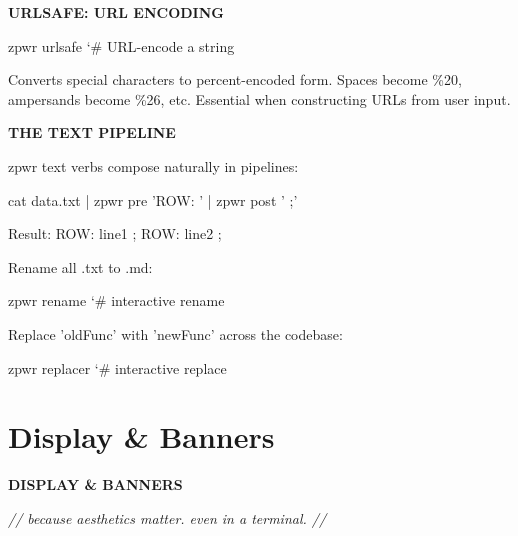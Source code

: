 \documentclass[11pt,a4paper,twoside]{book}
\begin{document}
\vspace{12pt}
{\bfseries\color{neonyellow} URLSAFE: URL ENCODING}\vspace{4pt}

\begin{codebox}
\color{neongreen}zpwr urlsafe                        {\char`\#} URL-encode a string\\
\end{codebox}

Converts special characters to percent-encoded form. Spaces become \%20, ampersands become \%26, etc. Essential when constructing URLs from user input.


\vspace{12pt}
{\bfseries\color{neonyellow} THE TEXT PIPELINE}\vspace{4pt}

zpwr text verbs compose naturally in pipelines:

\begin{codebox}
\color{neongreen}cat data.txt | zpwr pre 'ROW: ' | zpwr post ' ;'\\
\end{codebox}

Result: ROW: line1 ; ROW: line2 ;

Rename all .txt to .md:

\begin{codebox}
\color{neongreen}zpwr rename                         {\char`\#} interactive rename\\
\end{codebox}

Replace 'oldFunc' with 'newFunc' across the codebase:

\begin{codebox}
\color{neongreen}zpwr replacer                       {\char`\#} interactive replace\\
\end{codebox}


\vspace{16pt}

\section{Display \& Banners}


\vspace{10pt}
{\large\bfseries\color{neoncyan} DISPLAY \& BANNERS}\vspace{6pt}

{\small\itshape\color{dimtext} // because aesthetics matter. even in a terminal. //}
\end{document}
